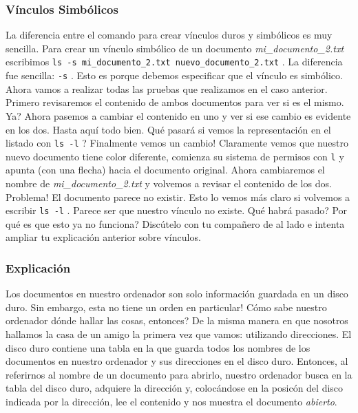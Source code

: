 \documentclass[10pt,letterpaper]{article}
\newcommand{\inlinecode}[1]{
\colorbox{light-gray}{\texttt{#1}}
}
\begin{document}
\subsubsection{V\'inculos Simb\'olicos}
La diferencia entre el comando para crear v\'inculos duros y simb\'olicos es muy sencilla. Para crear un v\'inculo simb\'olico de un documento \emph{mi\_documento\_2.txt} escribimos \inlinecode{ls -s mi\_documento\_2.txt nuevo\_documento\_2.txt}. La diferencia fue sencilla: \inlinecode{-s}. Esto es porque debemos especificar que el v\'inculo es simb\'olico. Ahora vamos a realizar todas las pruebas que realizamos en el caso anterior. Primero revisaremos el contenido de ambos documentos para ver si es el mismo. Ya? Ahora pasemos a cambiar el contenido en uno y ver si ese cambio es evidente en los dos. Hasta aqu\'i todo bien. Qu\'e pasar\'a si vemos la representaci\'on en el listado con \inlinecode{ls -l}? Finalmente vemos un cambio! Claramente vemos que nuestro nuevo documento tiene color diferente, comienza su sistema de permisos con \inlinecode{l} y apunta (con una flecha) hacia el documento original. Ahora cambiaremos el nombre de \emph{mi\_documento\_2.txt} y volvemos a revisar el contenido de los dos. Problema! El documento parece no existir. Esto lo vemos m\'as claro si volvemos a escribir \inlinecode{ls -l}. Parece ser que nuestro v\'inculo no existe. Qu\'e habr\'a pasado? Por qu\'e es que esto ya no funciona? Disc\'utelo con tu compa\~nero de al lado e intenta ampliar tu explicaci\'on anterior sobre v\'inculos.

\subsubsection{Explicaci\'on}
Los documentos en nuestro ordenador son solo informaci\'on guardada en un disco duro. Sin embargo, esta no tiene un orden en particular! C\'omo sabe nuestro ordenador d\'onde hallar las cosas, entonces? De la misma manera en que nosotros hallamos la casa de un amigo la primera vez que vamos: utilizando direcciones. El disco duro contiene una tabla en la que guarda todos los nombres de los documentos en nuestro ordenador y sus direcciones en el disco duro. Entonces, al referirnos al nombre de un documento para abrirlo, nuestro ordenador busca en la tabla del disco duro, adquiere la direcci\'on y, coloc\'andose en la posic\'on del disco indicada por la direcci\'on, lee el contenido y nos muestra el documento \emph{abierto}.\\
\end{document}
